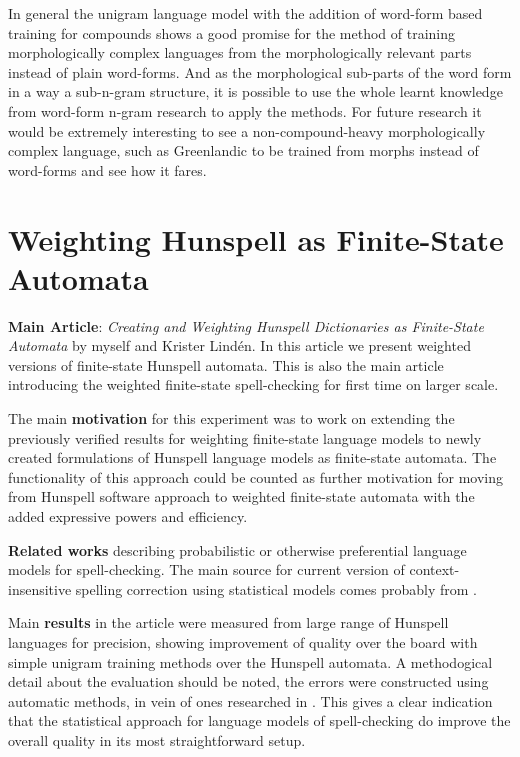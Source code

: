 \documentclass[officiallayout]{unihelcompling}
\begin{document}
In general the unigram language model with the addition of word-form based
training for compounds shows a good promise for the method of training
morphologically complex languages from the morphologically relevant parts
instead of plain word-forms. And as the morphological sub-parts of the word
form in a way a sub-n-gram structure, it is possible to use the whole learnt
knowledge from word-form n-gram research to apply the methods. For future
research it would be extremely interesting to see a non-compound-heavy
morphologically complex language, such as Greenlandic to be trained from morphs
instead of word-forms and see how it fares.

\section{Weighting Hunspell as Finite-State Automata}
\label{sec:hunspell-training}

\textbf{Main Article}: \emph{Creating and Weighting Hunspell Dictionaries as Finite-State Automata} by myself and Krister Lindén. In this article we present
weighted versions of finite-state Hunspell automata. This is also the main
article introducing the weighted finite-state spell-checking for first time
on larger scale.

The main \textbf{motivation} for this experiment was to work on extending the
previously verified results for weighting finite-state language models to newly
created formulations of Hunspell language models as finite-state automata. The
functionality of this approach could be counted as further motivation for
moving from Hunspell software approach to weighted finite-state automata with
the added expressive powers and efficiency.

\textbf{Related works} describing probabilistic or otherwise preferential
language models for spell-checking. The main source for current version of 
context-insensitive spelling correction using statistical models comes
probably from \citep{church1991probability}.

Main \textbf{results} in the article were measured from large range of Hunspell
languages for precision, showing improvement of quality over the board with
simple unigram training methods over the Hunspell automata. A methodogical
detail about the evaluation should be noted, the errors were constructed using
automatic methods, in vein of ones researched in
\citep{bigert2003autoeval,bigert2005automatic}. This gives a clear indication
that the statistical approach for language models of spell-checking do improve
the overall quality in its most straightforward setup.
\end{document}
